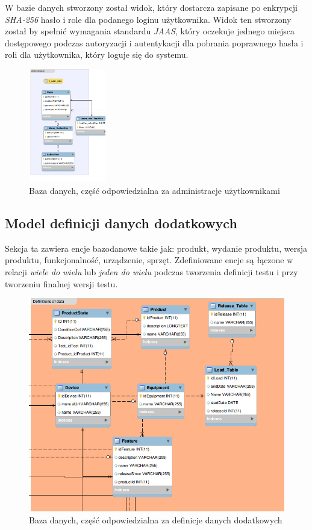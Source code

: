 W bazie danych stworzony został widok, który dostarcza zapisane po enkrypcji \textit{SHA-256} hasło i role dla podanego loginu użytkownika. Widok ten stworzony został by spełnić wymagania standardu \textit{JAAS}, który oczekuje jednego miejsca dostępowego podczas autoryzacji i autentykacji dla pobrania poprawnego hasła i roli dla użytkownika, który loguje się do systemu.
\begin{figure}[h!]
	\centering
		\includegraphics[width=0.3\textwidth]{img/bazaDanychAdministracja.png}  %
	\caption{Baza danych, część odpowiedzialna za administracje użytkownikami}
	\label{fig:bazaAdmin}
\end{figure}
\subsection{Model definicji danych dodatkowych}   

Sekcja ta zawiera encje bazodanowe takie jak: produkt, wydanie produktu, wersja produktu, funkcjonalność, urządzenie, sprzęt. Zdefiniowane encje są łączone w relacji \textit{wiele do wielu} lub \textit{jeden do wielu} podczas tworzenia definicji testu i przy tworzeniu finalnej wersji testu.
   \begin{figure}[h]
\centerline{\includegraphics[scale=0.5]{img/bazaDanychDefinicjaDanych.png}}
 \label{fig:bazaDane}
      \caption{Baza danych, część odpowiedzialna za definicje danych dodatkowych}
\end{figure}

